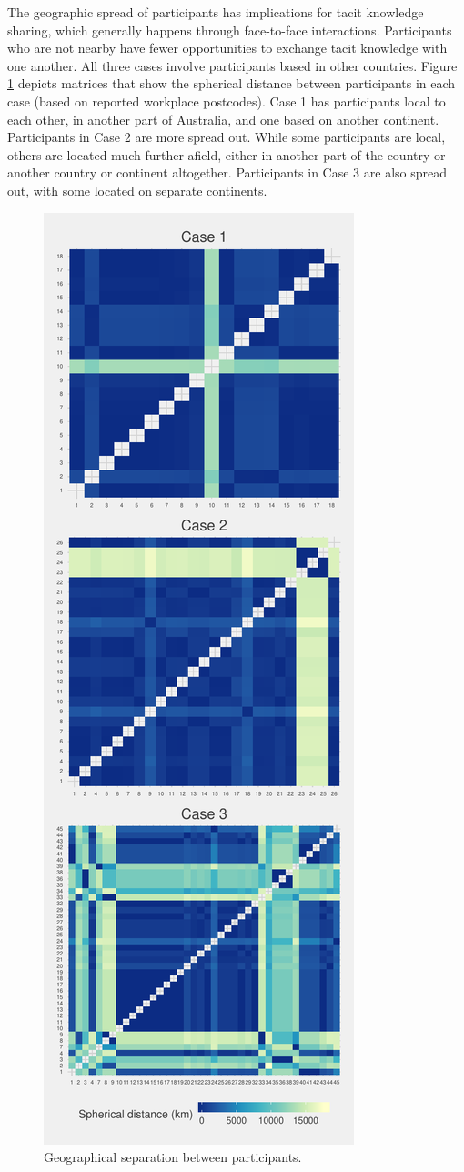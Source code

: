 The geographic spread of participants has implications for tacit knowledge sharing, which generally happens through face-to-face interactions. Participants who are not nearby have fewer opportunities to exchange tacit knowledge with one another. All three cases involve participants based in other countries. Figure \ref{fig:spherical} depicts matrices that show the spherical distance between participants in each case (based on reported workplace postcodes). Case 1 has participants local to each other, in another part of Australia, and one based on another continent. Participants in Case 2 are more spread out. While some participants are local, others are located much further afield, either in another part of the country or another country or continent altogether. Participants in Case 3 are also spread out, with some located on separate continents.  \medskip

\begin{figure}[h!]
\centering
\includegraphics[width = 0.5\linewidth]{Images/proximity.pdf}
\caption[Geographical separation between participants]{Geographical separation between participants.}
\label{fig:spherical}
\end{figure}

